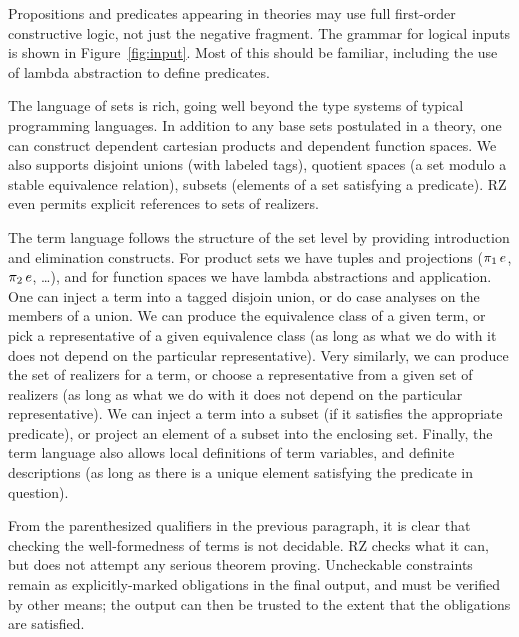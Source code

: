 Propositions and predicates appearing in theories may use full
first-order constructive logic, not just the negative fragment. The
grammar for logical inputs is shown in Figure~\ref{fig:input}. Most of
this should be familiar, including the use of lambda abstraction to
define predicates.

The language of sets is rich, going well beyond the type systems of
typical programming languages. In addition to any base sets postulated
in a theory, one can construct dependent cartesian products and
dependent function spaces. We also supports disjoint unions (with
labeled tags), quotient spaces (a set modulo a stable equivalence
relation), subsets (elements of a set satisfying a predicate). RZ even
permits explicit references to sets of realizers.

The term language follows the structure of the set level by providing
introduction and elimination constructs. For product sets we have
tuples and projections ($\mathop{\pi_{1}} e$, $\mathop{\pi_{2}} e$, \ldots),
and for function spaces we have lambda abstractions and application.
One can inject a term into a tagged disjoin union, or do case analyses
on the members of a union. We can produce the equivalence class of a
given term, or pick a representative of a given equivalence class (as
long as what we do with it does not depend on the particular
representative). Very similarly, we can produce the set of realizers
for a term, or choose a representative from a given set of realizers
(as long as what we do with it does not depend on the particular
representative). We can inject a term into a subset (if it satisfies
the appropriate predicate), or project an element of a subset into the
enclosing set. Finally, the term language also allows local
definitions of term variables, and definite descriptions (as long as
there is a unique element satisfying the predicate in question).

From the parenthesized qualifiers in the previous paragraph, it is
clear that checking the well-formedness of terms is not decidable. RZ
checks what it can, but does not attempt any serious theorem proving.
Uncheckable constraints remain as explicitly-marked obligations
in the final output, and must be verified by other means; the output
can then be trusted to the extent that the obligations are satisfied.


